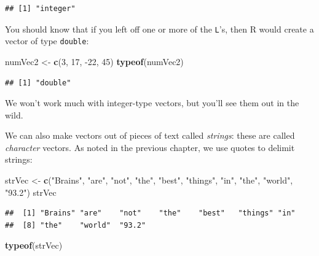 \documentclass[]{book}
\makeatletter
\newenvironment{Shaded}{\begin{snugshade}}{\end{snugshade}}
\newcommand{\KeywordTok}[1]{\textcolor[rgb]{0.13,0.29,0.53}{\textbf{{#1}}}}
\newcommand{\DecValTok}[1]{\textcolor[rgb]{0.00,0.00,0.81}{{#1}}}
\newcommand{\StringTok}[1]{\textcolor[rgb]{0.31,0.60,0.02}{{#1}}}
\newcommand{\NormalTok}[1]{{#1}}
\newenvironment{kframe}{%
\medskip{}
\setlength{\fboxsep}{.8em}
 \def\at@end@of@kframe{}%
 \ifinner\ifhmode%
  \def\at@end@of@kframe{\end{minipage}}%
  \begin{minipage}{\columnwidth}%
 \fi\fi%
 \def\FrameCommand##1{\hskip\@totalleftmargin \hskip-\fboxsep
 \colorbox{shadecolor}{##1}\hskip-\fboxsep
     \hskip-\linewidth \hskip-\@totalleftmargin \hskip\columnwidth}%
 \MakeFramed {\advance\hsize-\width
   \@totalleftmargin\z@ \linewidth\hsize
   \@setminipage}}%
 {\par\unskip\endMakeFramed%
 \at@end@of@kframe}
\renewenvironment{Shaded}{\begin{kframe}}{\end{kframe}}
\theoremstyle{definition}
\theoremstyle{definition}
\theoremstyle{remark}
\makeatother
\begin{document}
\begin{verbatim}
## [1] "integer"
\end{verbatim}

You should know that if you left off one or more of the \texttt{L}'s,
then R would create a vector of type \texttt{double}:

\begin{Shaded}
\begin{Highlighting}[]
\NormalTok{numVec2 <-}\StringTok{ }\KeywordTok{c}\NormalTok{(}\DecValTok{3}\NormalTok{, }\DecValTok{17}\NormalTok{, -}\DecValTok{22}\NormalTok{, }\DecValTok{45}\NormalTok{)}
\KeywordTok{typeof}\NormalTok{(numVec2)}
\end{Highlighting}
\end{Shaded}

\begin{verbatim}
## [1] "double"
\end{verbatim}

We won't work much with integer-type vectors, but you'll see them out in
the wild.

We can also make vectors out of pieces of text called
\emph{strings}: these are called
\emph{character} vectors. As noted in the previous
chapter, we use quotes to delimit strings:

\begin{Shaded}
\begin{Highlighting}[]
\NormalTok{strVec <-}\StringTok{ }\KeywordTok{c}\NormalTok{(}\StringTok{"Brains"}\NormalTok{, }\StringTok{"are"}\NormalTok{, }\StringTok{"not"}\NormalTok{, }\StringTok{"the"}\NormalTok{, }\StringTok{"best"}\NormalTok{, }
            \StringTok{"things"}\NormalTok{, }\StringTok{"in"}\NormalTok{, }\StringTok{"the"}\NormalTok{, }\StringTok{"world"}\NormalTok{, }\StringTok{"93.2"}\NormalTok{)}
\NormalTok{strVec}
\end{Highlighting}
\end{Shaded}

\begin{verbatim}
##  [1] "Brains" "are"    "not"    "the"    "best"   "things" "in"    
##  [8] "the"    "world"  "93.2"
\end{verbatim}

\begin{Shaded}
\begin{Highlighting}[]
\KeywordTok{typeof}\NormalTok{(strVec)}
\end{Highlighting}
\end{Shaded}
\end{document}
